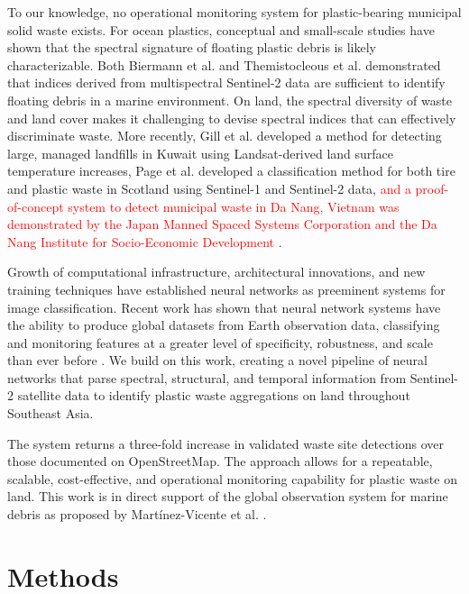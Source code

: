\documentclass[10pt,letterpaper]{article}
\begin{document}
To our knowledge, no operational monitoring system for plastic-bearing municipal solid waste exists. For ocean plastics, conceptual \cite{goddijn2018concept} and small-scale \cite{acuna2018anthropogenic} studies have shown that the spectral signature of floating plastic debris is likely characterizable. Both Biermann et al. \cite{biermann2020finding} and Themistocleous et al. \cite{themistocleous2020investigating} demonstrated that indices derived from multispectral Sentinel-2 data are sufficient to identify floating debris in a marine environment. On land, the spectral diversity of waste and land cover makes it challenging to devise spectral indices that can effectively discriminate waste. More recently, Gill et al. \cite{gill2019detection} developed a method for detecting large, managed landfills in Kuwait using Landsat-derived land surface temperature increases, Page et al. \cite{page2020identification} developed a classification method for both tire and plastic waste in Scotland using Sentinel-1 and Sentinel-2 data, \textcolor{red}{and a proof-of-concept system to detect municipal waste in Da Nang, Vietnam was demonstrated by the Japan Manned Spaced Systems Corporation and the Da Nang Institute for Socio-Economic Development \cite{nguyen_pham_2022}}.

Growth of computational infrastructure, architectural innovations, and new training techniques have established neural networks as preeminent systems for image classification. Recent work has shown that neural network systems have the ability to produce global datasets from Earth observation data, classifying and monitoring features at a greater level of specificity, robustness, and scale than ever before \cite{li2020global}\cite{bonafilia2019building}\cite{kruitwagen2021global}\cite{9553499}. We build on this work, creating a novel pipeline of neural networks that parse spectral, structural, and temporal information from Sentinel-2 satellite data to identify plastic waste aggregations on land throughout Southeast Asia.

The system returns a three-fold increase in validated waste site detections over those documented on OpenStreetMap. The approach allows for a repeatable, scalable, cost-effective, and operational monitoring capability for plastic waste on land. This work is in direct support of the global observation system for marine debris as proposed by Martínez-Vicente et al. \cite{martinez2019measuring}.

\section*{Methods}
\end{document}
